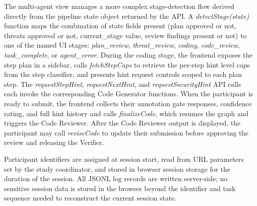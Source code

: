 The multi-agent view manages a more complex stage-detection flow derived directly from the pipeline state object returned by the API. A \textit{detectStage(state)} function maps the combination of state fields present (plan approved or not, threats approved or not, current\_stage value, review findings present or not) to one of the named UI stages: \textit{plan\_review}, \textit{threat\_review}, \textit{coding}, \textit{code\_review}, \textit{task\_complete}, or \textit{agent\_error}. During the coding stage, the frontend exposes the step plan in a sidebar, calls \textit{fetchStepCaps} to retrieve the per-step hint level caps from the step classifier, and presents hint request controls scoped to each plan step. The \textit{requestStepHint}, \textit{requestNextHint}, and \textit{requestSecurityHint} API calls each invoke the corresponding Code Generator functions. When the participant is ready to submit, the frontend collects their annotation gate responses, confidence rating, and full hint history and calls \textit{finalizeCode}, which resumes the graph and triggers the Code Reviewer. After the Code Reviewer output is displayed, the participant may call \textit{reviseCode} to update their submission before approving the review and releasing the Verifier.

Participant identifiers are assigned at session start, read from URL parameters set by the study coordinator, and stored in browser session storage for the duration of the session. All JSONL log records are written server-side; no sensitive session data is stored in the browser beyond the identifier and task sequence needed to reconstruct the current session state.
